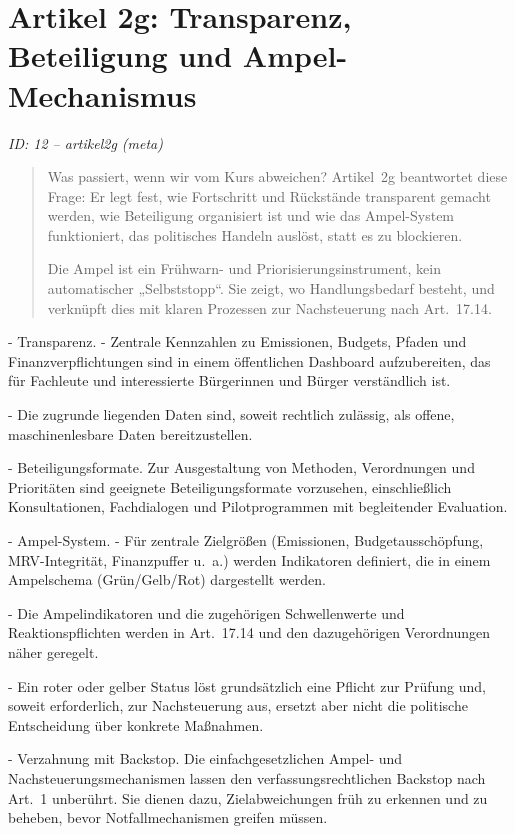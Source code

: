 \documentclass[12pt,a4paper]{scrartcl}
\begin{document}
\section[Artikel 2g: Transparenz, Beteiligung und Ampel-Mechanismus]{Artikel 2g: Transparenz, Beteiligung und Ampel-Mechanismus}
\noindent\textit{ID: 12 -- artikel2g (meta)}

\begin{quote}
Was passiert, wenn wir vom Kurs abweichen? Artikel 2g beantwortet diese Frage: Er legt fest, wie Fortschritt und Rückstände transparent gemacht werden, wie Beteiligung organisiert ist und wie das Ampel-System funktioniert, das politisches Handeln auslöst, statt es zu blockieren.

Die Ampel ist ein Frühwarn- und Priorisierungsinstrument, kein automatischer „Selbststopp“. Sie zeigt, wo Handlungsbedarf besteht, und verknüpft dies mit klaren Prozessen zur Nachsteuerung nach Art. 17.14.
\end{quote}

- Transparenz.
- Zentrale Kennzahlen zu Emissionen, Budgets, Pfaden und Finanzverpflichtungen sind in einem öffentlichen Dashboard aufzubereiten, das für Fachleute und interessierte Bürgerinnen und Bürger verständlich ist.

- Die zugrunde liegenden Daten sind, soweit rechtlich zulässig, als offene, maschinenlesbare Daten bereitzustellen.

- Beteiligungsformate. Zur Ausgestaltung von Methoden, Verordnungen und Prioritäten sind geeignete Beteiligungsformate vorzusehen, einschließlich Konsultationen, Fachdialogen und Pilotprogrammen mit begleitender Evaluation.

- Ampel-System.
- Für zentrale Zielgrößen (Emissionen, Budgetausschöpfung, MRV-Integrität, Finanzpuffer u. a.) werden Indikatoren definiert, die in einem Ampelschema (Grün/Gelb/Rot) dargestellt werden.

- Die Ampelindikatoren und die zugehörigen Schwellenwerte und Reaktionspflichten werden in Art. 17.14 und den dazugehörigen Verordnungen näher geregelt.

- Ein roter oder gelber Status löst grundsätzlich eine Pflicht zur Prüfung und, soweit erforderlich, zur Nachsteuerung aus, ersetzt aber nicht die politische Entscheidung über konkrete Maßnahmen.

- Verzahnung mit Backstop. Die einfachgesetzlichen Ampel- und Nachsteuerungsmechanismen lassen den verfassungsrechtlichen Backstop nach Art. 1 unberührt. Sie dienen dazu, Zielabweichungen früh zu erkennen und zu beheben, bevor Notfallmechanismen greifen müssen.
\end{document}

